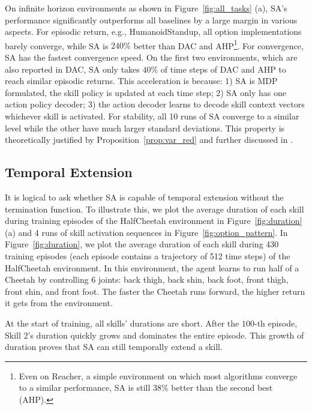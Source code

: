 On infinite horizon environments as shown in
Figure~\ref{fig:all_tasks} (a), SA's performance significantly
outperforms all baselines by a large margin in various aspects.
For episodic return, e.g., HumanoidStandup, all option
implementations barely converge, while SA is $240\%$ better than
DAC and AHP\footnote{Even on Reacher, a simple environment on
  which most algorithms converge to a similar performance, SA is
  still $38\%$ better than the second best (AHP).}. For
convergence, SA has the fastest convergence speed. On the first
two environments, which are also reported in DAC, SA only takes
$40\%$ of time steps of DAC and AHP to reach similar episodic
returns. This acceleration is because: 1) SA is MDP formulated,
the skill policy is updated at each time step; 2) SA only has one
action policy decoder; 3) the action decoder learns to decode
skill context vectors whichever skill is activated. For
stability, all 10 runs of SA converge to a similar level while
the other have much larger standard deviations. This property is
theoretically justified by Proposition~\ref{prop:var_red} and
further discussed in .

\subsection{Temporal Extension}
\label{sec:exp_ext}

It is logical to ask whether SA is capable of temporal extension
without the termination function. To illustrate this, we plot the
average duration of each skill during training episodes of the
HalfCheetah environment in Figure~\ref{fig:duration} (a) and 4
runs of skill activation sequences in
Figure~\ref{fig:option_pattern}. In Figure~\ref{fig:duration}, we
plot the average duration of each skill during 430 training
episodes (each episode contains a trajectory of 512 time steps)
of the HalfCheetah environment. In this environment, the agent
learns to run half of a Cheetah by controlling 6 joints: back
thigh, back shin, back foot, front thigh, front shin, and front
foot. The faster the Cheetah runs forward, the higher return it
gets from the environment.

At the start of training, all skills' durations are short. After
the $100$-th episode, Skill 2's duration quickly grows and
dominates the entire episode. This growth of duration proves that
SA can still temporally extend a skill.

